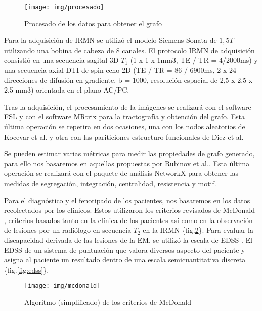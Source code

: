 \documentclass[fleqn,12pt]{UICArticle} %
\begin{document}
\begin{figure}[h]
	\centering
	\texttt{[image: img/procesado]}
	\vspace{5mm} 
	\caption{Procesado de los datos para obtener el grafo}
	\label{fig:pipeline}
\end{figure}


Para la adquisición de IRMN se utilizó el modelo Siemens Sonata de $1,5T$ utilizando una bobina de cabeza de $8$ canales. El protocolo IRMN de adquisición consistió en una secuencia sagital 3D $T_1$ (1 x 1 x 1mm3, TE / TR = 4/2000ms) y una secuencia axial DTI de spin-echo 2D (TE / TR = 86 / 6900ms, 2 x 24 direcciones de difusión en gradiente, b = 1000, resolución espacial de 2,5 x 2,5 x 2,5 mm3) orientada en el plano AC/PC.

Tras la adquisición, el procesamiento de la imágenes se realizará con el software FSL \cite{Jenkinson2012} y con el software MRtrix \cite{Tournier2012} para la tractografía y obtención del grafo. Esta última operación se repetira en dos ocasiones, una con los nodos aleatorios de Kocevar et al. y otra con las pariticiones estructuro-funcionales de Diez et al. 

Se pueden estimar varias métricas para medir las propiedades de grafo generado, para ello nos basaremos en aquellas propuestas por Rubinov et al.\cite{Rubinov2010}. Esta última operación se realizará con el paquete de análisis NetworkX para obtener las medidas de segregación, integración, centralidad, resistencia y motif.


Para el diagnóstico y el fenotipado de los pacientes, nos basaremos en los datos recolectados por los clínicos. Estos utilizaron los criterios revisados de McDonald \cite{Mcdonald2001, Polman2011}, criterios basados tanto en la clínica de los pacientes así como en la observación de lesiones por un radiólogo en secuencia $T_2$ en la IRMN \{fig.\ref{fig:mcdonald}\}.  Para evaluar la discapacidad derivada de las lesiones de la EM, se utilizó la escala de EDSS \cite{Kurtzke1983}. El EDSS de un sistema de puntuación que valora diversos aspecto del paciente y asigna al paciente un resultado dentro de una escala semicuantitativa discreta \{fig.\ref{fig:edss}\}.

\begin{figure}[b]
	\centering
	\texttt{[image: img/mcdonald]}
	\vspace{5mm} 
	\caption{Algoritmo (simplificado) de los criterios de McDonald}
	\label{fig:mcdonald}
\end{figure}
\end{document}
